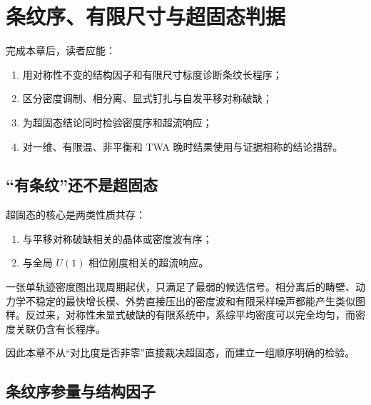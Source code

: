 \chapter{条纹序、有限尺寸与超固态判据}
\label{ch:order-diagnostics}

\begin{learningobjectives}
完成本章后，读者应能：
\begin{enumerate}
  \item 用对称性不变的结构因子和有限尺寸标度诊断条纹长程序；
  \item 区分密度调制、相分离、显式钉扎与自发平移对称破缺；
  \item 为超固态结论同时检验密度序和超流响应；
  \item 对一维、有限温、非平衡和 TWA 晚时结果使用与证据相称的结论措辞。
\end{enumerate}
\end{learningobjectives}

\section{“有条纹”还不是超固态}

超固态的核心是两类性质共存\cite{Boninsegni2012}：
\begin{enumerate}
  \item 与平移对称破缺相关的晶体或密度波有序；
  \item 与全局 $U(1)$ 相位刚度相关的超流响应。
\end{enumerate}
一张单轨迹密度图出现周期起伏，只满足了最弱的候选信号。相分离后的畴壁、动力学不稳定的最快增长模、外势直接压出的密度波和有限采样噪声都能产生类似图样。反过来，对称性未显式破缺的有限系统中，系综平均密度可以完全均匀，而密度关联仍含有长程序。

因此本章不从“对比度是否非零”直接裁决超固态，而建立一组顺序明确的检验。

\section{条纹序参量与结构因子}

